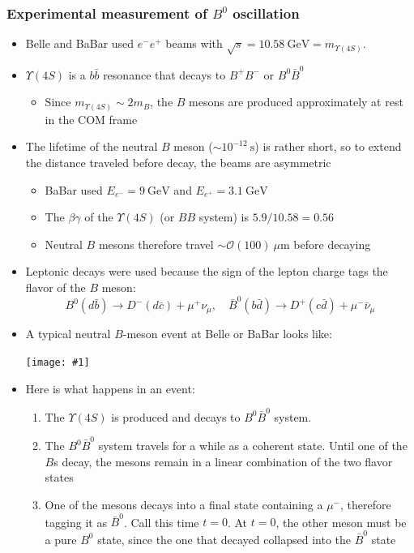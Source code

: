 \documentclass[11pt]{article}
\newcommand{\nubar}{{\bar{\nu}}}
\newcommand{\dbar}{\bar{d}}
\newcommand{\bbar}{\bar{b}}
\newcommand{\cbar}{\bar{c}}
\newcommand{\gev}{\text{GeV}}
\newcommand{\s}{\text{s}}
\newcommand{\mum}{\mu\text{m}}
\newcommand{\el}{\ensuremath{e^{-}}\xspace}
\newcommand{\pos}{\ensuremath{e^{+}}\xspace}
\newcommand{\ord}[1]{\ensuremath{\mathcal{O}(#1)}}
\newcommand{\embedimgw}[2]{\begin{center}\texttt{[image: \#1]}\end{center}}
\begin{document}
\subsubsection{Experimental measurement of $B^0$ oscillation}
\begin{itemize}
  \item Belle and BaBar used $\el\pos$ beams with $\sqrt s = 10.58~\gev = m_{\Upsilon(4S)}$.
  \item $\Upsilon(4S)$ is a $b\bbar$ resonance that decays to $B^+ B^-$ or $B^0 \bar B^0$
  \begin{itemize}
    \item Since $m_{\Upsilon(4S)} \sim 2 m_B$, the $B$ mesons are produced approximately at rest in the COM frame
  \end{itemize}
  \item The lifetime of the neutral $B$ meson ($\sim 10^{-12}~\s$) is rather short, so to extend the distance traveled before decay, the beams are asymmetric
  \begin{itemize}
    \item BaBar used $E_\el = 9~\gev$ and $E_\pos = 3.1~\gev$
    \item The $\beta\gamma$ of the $\Upsilon(4S)$  (or $BB$ system) is $5.9/10.58 = 0.56$
    \item Neutral $B$ mesons therefore travel $\sim \ord{100}~\mum$ before decaying
  \end{itemize}
  \item Leptonic decays were used because the sign of the lepton charge tags the flavor of the $B$ meson:
  \begin{equation}
    B^0(d\bbar)\rightarrow D^- (d\cbar)+\mu^+\nu_\mu,\quad \bar B^0 (b\dbar) \rightarrow D^+(c\dbar) + \mu^-\nubar_\mu
  \end{equation}
  \item A typical neutral $B$-meson event at Belle or BaBar looks like:
  \embedimgw{figs/babar.png}{.6}
  \item Here is what happens in an event:
  \begin{enumerate}
    \item The $\Upsilon(4S)$ is produced and decays to $B^0 \bar B^0$ system. 
    \item The $B^0 \bar B^0$ system travels for a while as a coherent state. Until one of the $B$s decay, the mesons remain in a linear combination of the two flavor states
    \item One of the mesons decays into a final state containing a $\mu^-$, therefore tagging it as $\bar B^0$. Call this time $t=0$. At $t=0$, the other meson must be a pure $B^0$ state, since the one that decayed collapsed into the $\bar B^0$ state

\end{enumerate}
\end{itemize}
\end{document}
